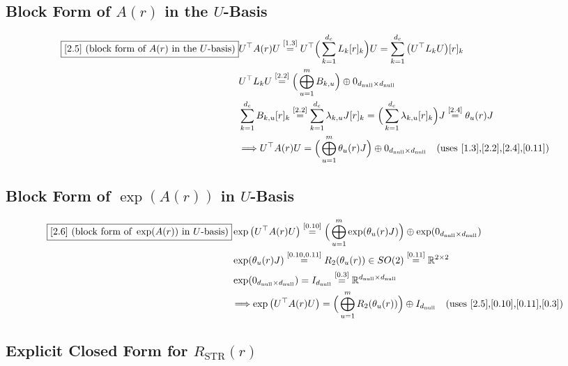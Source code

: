 \documentclass[11pt]{article}
\newcommand{\eqref}[1]{\overset{[#1]}{=}}
\begin{document}
\subsection{Block Form of $A(r)$ in the $U$-Basis}

\begin{align}
\boxed{[2.5] \text{ (block form of }A(r)\text{ in the }U\text{-basis)}}
&U^\top
A(r)
U
\eqref{1.3}
U^\top
\Big(
\sum_{k=1}^{d_c}
L_k [r]_k
\Big)
U
=
\sum_{k=1}^{d_c}
\big(
U^\top L_k U
\big)
[r]_k \notag\\
&U^\top L_k U
\eqref{2.2}
\Big(
\bigoplus_{u=1}^{m}
B_{k,u}
\Big)
\oplus
0_{d_{\mathrm{null}}\times d_{\mathrm{null}}} \notag\\
&\sum_{k=1}^{d_c}
B_{k,u}
[r]_k
\eqref{2.2}
\sum_{k=1}^{d_c}
\lambda_{k,u}J
[r]_k
=
\Big(
\sum_{k=1}^{d_c}
\lambda_{k,u}[r]_k
\Big)
J
\eqref{2.4}
\theta_u(r)J \notag\\
&\Longrightarrow
U^\top A(r) U
=
\Big(
\bigoplus_{u=1}^{m}
\theta_u(r)J
\Big)
\oplus
0_{d_{\mathrm{null}}\times d_{\mathrm{null}}}
\quad(\text{uses [1.3],[2.2],[2.4],[0.11]})
\end{align}

\subsection{Block Form of $\exp(A(r))$ in $U$-Basis}

\begin{align}
\boxed{[2.6] \text{ (block form of }\exp(A(r))\text{ in }U\text{-basis)}}
&\exp\big(
U^\top A(r) U
\big)
\eqref{0.10}
\Big(
\bigoplus_{u=1}^{m}
\exp(\theta_u(r)J)
\Big)
\oplus
\exp(0_{d_{\mathrm{null}}\times d_{\mathrm{null}}}) \notag\\
&\exp(\theta_u(r)J)
\eqref{0.10,0.11}
R_2(\theta_u(r))
\in SO(2)
\eqref{0.11}
\mathbb{R}^{2\times 2} \notag\\
&\exp(0_{d_{\mathrm{null}}\times d_{\mathrm{null}}})
=
I_{d_{\mathrm{null}}}
\eqref{0.3}
\mathbb{R}^{d_{\mathrm{null}}\times d_{\mathrm{null}}} \notag\\
&\Longrightarrow
\exp\big(U^\top A(r) U\big)
=
\Big(
\bigoplus_{u=1}^{m}
R_2(\theta_u(r))
\Big)
\oplus
I_{d_{\mathrm{null}}}
\quad(\text{uses [2.5],[0.10],[0.11],[0.3]})
\end{align}

\subsection{Explicit Closed Form for $R_{\mathrm{STR}}(r)$}
\end{document}
